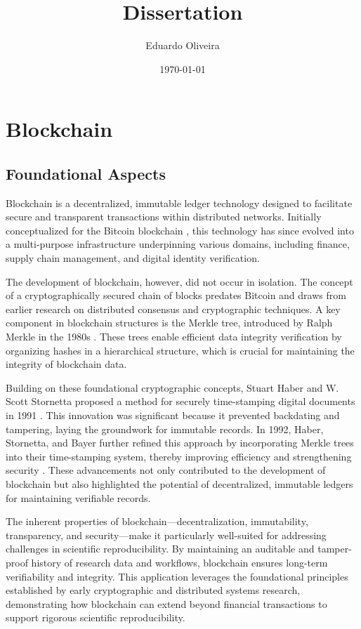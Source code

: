 \documentclass{article}
\title{Dissertation}
\author{Eduardo Oliveira}
\date{\today}
\begin{document}
\maketitle



\section{Blockchain}

\subsection{Foundational Aspects}

Blockchain is a decentralized, immutable ledger technology designed to facilitate secure and transparent transactions within distributed networks. Initially conceptualized for the Bitcoin blockchain \cite{nakamoto2012bitcoin}, this technology has since evolved into a multi-purpose infrastructure underpinning various domains, including finance, supply chain management, and digital identity verification.

The development of blockchain, however, did not occur in isolation. The concept of a cryptographically secured chain of blocks predates Bitcoin and draws from earlier research on distributed consensus and cryptographic techniques. A key component in blockchain structures is the Merkle tree, introduced by Ralph Merkle in the 1980s \cite{goos_digital_1988}. These trees enable efficient data integrity verification by organizing hashes in a hierarchical structure, which is crucial for maintaining the integrity of blockchain data.

Building on these foundational cryptographic concepts, Stuart Haber and W. Scott Stornetta proposed a method for securely time-stamping digital documents in 1991 \cite{haber_how_1991}. This innovation was significant because it prevented backdating and tampering, laying the groundwork for immutable records. In 1992, Haber, Stornetta, and Bayer further refined this approach by incorporating Merkle trees into their time-stamping system, thereby improving efficiency and strengthening security \cite{bayer_improving_1993}. These advancements not only contributed to the development of blockchain but also highlighted the potential of decentralized, immutable ledgers for maintaining verifiable records.

The inherent properties of blockchain—decentralization, immutability, transparency, and security—make it particularly well-suited for addressing challenges in scientific reproducibility. By maintaining an auditable and tamper-proof history of research data and workflows, blockchain ensures long-term verifiability and integrity. This application leverages the foundational principles established by early cryptographic and distributed systems research, demonstrating how blockchain can extend beyond financial transactions to support rigorous scientific reproducibility.
\end{document}
